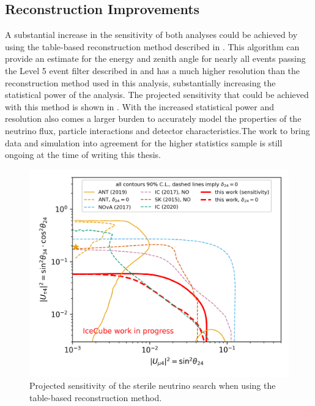 \subsection{Reconstruction Improvements}
A substantial increase in the sensitivity of both analyses could be achieved by using the table-based reconstruction method described in \cite{lowen-reco-paper}.
This algorithm can provide an estimate for the energy and zenith angle for nearly all events passing the Level 5 event filter described in  and has a much higher resolution than the reconstruction method used in this analysis, substantially increasing the statistical power of the analysis.
The projected sensitivity that could be achieved with this method is shown in . With the increased statistical power and resolution also comes a larger burden to accurately model the properties of the neutrino flux, particle interactions and detector characteristics.The work to bring data and simulation into agreement for the higher statistics sample is still ongoing at the time of writing this thesis.
\begin{figure}
    \centering
    \includegraphics[width=0.9\linewidth]{figures/summary/Sterile_mixing_sensitivity_90pct_retro.png}
    \caption{Projected sensitivity of the sterile neutrino search when using the table-based reconstruction method.\label{fig:retro-sensitivity}}
\end{figure}

